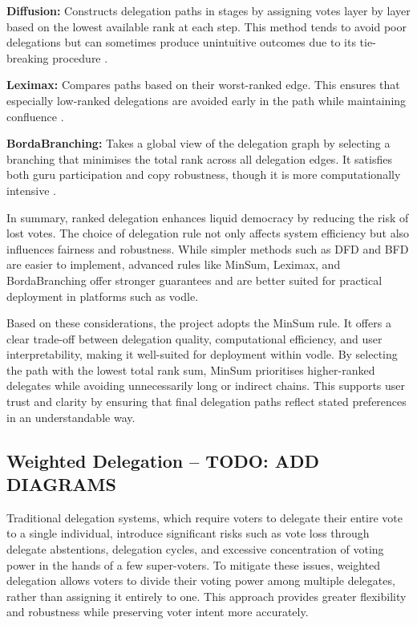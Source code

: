 \textbf{Diffusion:} Constructs delegation paths in stages by assigning votes layer by layer based on the lowest available rank at each step. This method tends to avoid poor delegations but can sometimes produce unintuitive outcomes due to its tie-breaking procedure \citep{brill_liquid_2022}.

\textbf{Leximax:} Compares paths based on their worst-ranked edge. This ensures that especially low-ranked delegations are avoided early in the path while maintaining confluence \citep{brill_liquid_2022}.

\textbf{BordaBranching:} Takes a global view of the delegation graph by selecting a branching that minimises the total rank across all delegation edges. It satisfies both guru participation and copy robustness, though it is more computationally intensive \citep{brill_liquid_2022}.

In summary, ranked delegation enhances liquid democracy by reducing the risk of lost votes. The choice of delegation rule not only affects system efficiency but also influences fairness and robustness. While simpler methods such as DFD and BFD are easier to implement, advanced rules like MinSum, Leximax, and BordaBranching offer stronger guarantees and are better suited for practical deployment in platforms such as vodle.

Based on these considerations, the project adopts the MinSum rule. It offers a clear trade-off between delegation quality, computational efficiency, and user interpretability, making it well-suited for deployment within vodle. By selecting the path with the lowest total rank sum, MinSum prioritises higher-ranked delegates while avoiding unnecessarily long or indirect chains. This supports user trust and clarity by ensuring that final delegation paths reflect stated preferences in an understandable way.


\subsection*{Weighted Delegation -- TODO: ADD DIAGRAMS}\label{subsec:vote_splitting_background}

Traditional delegation systems, which require voters to delegate their entire vote to a single individual, introduce significant risks such as vote loss through delegate abstentions, delegation cycles, and excessive concentration of voting power in the hands of a few super-voters. To mitigate these issues, weighted delegation allows voters to divide their voting power among multiple delegates, rather than assigning it entirely to one. This approach provides greater flexibility and robustness while preserving voter intent more accurately.

